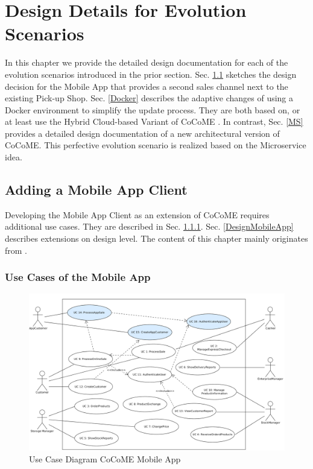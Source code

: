 \chapter{Design Details for Evolution Scenarios}
In this chapter we provide the detailed design documentation for each of the evolution scenarios
introduced in the prior section. Sec. \ref{App} sketches the design decision for the Mobile App that provides a second sales channel next to the existing Pick-up Shop. Sec. \ref{Docker} describes the adaptive changes of using a Docker environment to simplify the update process. They are both based on, or at least use the Hybrid Cloud-based Variant of CoCoME \cite{HeinrichRostamiReussner2016_1000052688}. In contrast, Sec. \ref{MS} provides a detailed design documentation of a new architectural version of CoCoME. This perfective evolution scenario is realized based on the Microservice idea.

\section{Adding a Mobile App Client} \label{App}
Developing the Mobile App Client as an extension of CoCoME requires additional use cases. They are described in Sec. \ref{UseCasesMobileApp}. Sec. \ref{DesignMobileApp} describes extensions on design level. The content of this chapter mainly originates from \cite{schnabel}.
\subsection{Use Cases of the Mobile App}\label{UseCasesMobileApp}
		\begin{figure}[t]
			\includegraphics[width=\textwidth]{img/UseCaseApp.png}
			\caption{Use Case Diagram CoCoME Mobile App}
		\end{figure}

